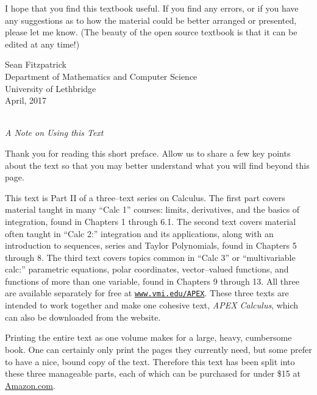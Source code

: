 I hope that you find this textbook useful. If you find any errors, or if you have any suggestions as to how the material could be better arranged or presented, please let me know. (The beauty of the open source textbook is that it can be edited at any time!)

\vspace{1in}

\begin{flushright}
Sean Fitzpatrick\\
Department of Mathematics and Computer Science\\
University of Lethbridge\\
April, 2017
\end{flushright}

\newpage

\Huge
{}\\
\large
\emph{A Note on Using this Text}
\baselineskip
\normalsize

Thank you for reading this short preface. Allow us to share a few key points about the text so that you may better understand what you will find beyond this page.

This text is Part II of a three--text series on Calculus. The first part covers material taught in many ``Calc 1'' courses: limits, derivatives, and the basics of integration, found in Chapters 1 through 6.1. The second text covers material often taught in ``Calc 2:'' integration and its applications, along with an introduction to sequences, series and Taylor Polynomials, found in Chapters 5 through 8. The third text covers topics common in ``Calc 3'' or ``multivariable calc:'' parametric equations, polar coordinates, vector--valued functions, and functions of more than one variable, found in Chapters 9 through 13. All three are available separately for free at \texttt{\href{http://www.vmi.edu/APEX}{www.vmi.edu/APEX}}. These three texts are intended to work together and make one cohesive text, \textit{APEX Calculus}, which can also be downloaded from the website. 

Printing the entire text as one volume makes for a large, heavy, cumbersome book. One can certainly only print the pages they currently need, but some prefer to have a nice, bound copy of the text. Therefore this text has been split into these three manageable parts, each of which can be purchased for under \$15 at \href{http://amazon.com}{Amazon.com}. 

